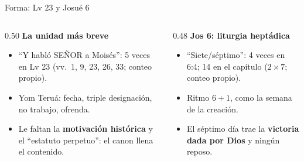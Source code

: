 \documentclass[hyperref={bookmarks=false},aspectratio=169]{beamer}
\newcommand{\SENOR}{S{\fontsize{0.78em}{1em}\selectfont EÑOR}}
\newcommand{\destacar}[1]{\textbf{\textcolor{tierraroja}{#1}}}
\begin{document}
\begin{frame}{Forma: Lv 23 y Josué 6}
\begin{columns}[t,onlytextwidth]
\begin{column}{0.50\textwidth}\small\RaggedRight
\textbf{\textcolor{tierraroja}{La unidad más breve}}
\begin{itemize}
\item ``Y habló \SENOR{} a Moisés'': 5 veces en Lv 23 (vv.~1, 9, 23, 26, 33; conteo propio).
\item Yom Teruá: fecha, triple designación, no trabajo, ofrenda.
\item Le faltan la \destacar{motivación histórica} y el ``estatuto perpetuo'': el canon llena el contenido.
\end{itemize}
\end{column}
\begin{column}{0.48\textwidth}\small\RaggedRight
\textbf{\textcolor{tierraroja}{Jos 6: liturgia heptádica}}
\begin{itemize}
\item ``Siete/séptimo'': 4 veces en 6:4; 14 en el capítulo ($2\times7$; conteo propio).
\item Ritmo $6+1$, como la semana de la creación.
\item El séptimo día trae la \destacar{victoria dada por Dios} y ningún reposo.
\end{itemize}
\end{column}
\end{columns}
\end{frame}
\end{document}
